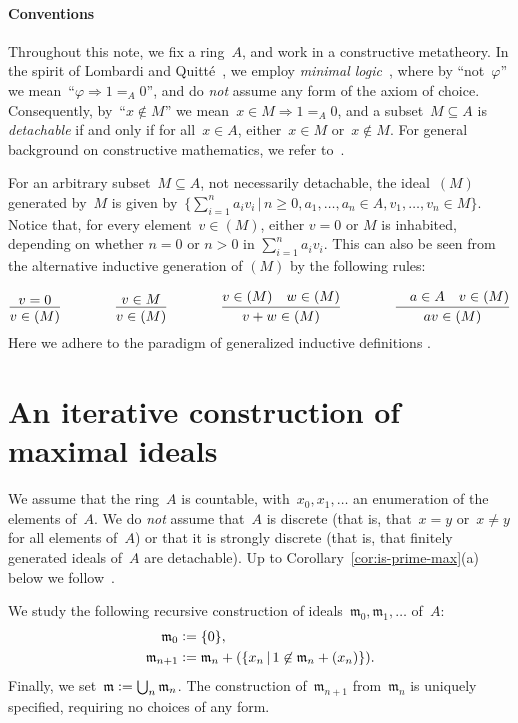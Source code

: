 \documentclass[com,11pt,crcready]{iosart2x}
\theoremstyle{definition}
\theoremstyle{plain}
\theoremstyle{remark}
\newcommand{\mmm}{\mathfrak{m}}
\newcommand{\defeq}{\vcentcolon=}
\renewcommand{\_}{\mathpunct{.}\,}
\begin{document}
\paragraph{Conventions} Throughout this note, we fix a ring~$A$, and work in a constructive metatheory.
In the spirit of Lombardi and Quitté~\cite{lombardi-quitte:constructive-algebra}, we employ \emph{minimal
logic}~\cite{johansson:minimal}, where by ``not~$\varphi$'' we mean~``$\varphi \Rightarrow 1 =_A 0$'', and do \emph{not} assume any form of the axiom of choice. Consequently,
by~``$x \not\in M$'' we mean~$x \in M \Rightarrow 1 =_A 0$, and a subset~$M
\subseteq A$ is \emph{detachable} if and only if for all~$x \in A$, either~$x \in M$
or~$x \not\in M$. For general background on constructive mathematics, we refer
to~\cite{bauer:five-stages,bauer:int-mathematics,sep:constructive-mathematics}.

For an arbitrary subset~$M \subseteq A$, not necessarily
detachable, the ideal~$(M)$ generated by~$M$ is given by~$\bigl\{ \sum_{i=1}^n
a_i v_i \,\Big|\, n \geq 0, a_1,\ldots,a_n \in A, v_1,\ldots,v_n \in M \bigr\}$.
Notice that, for every element~$v \in (M)$, either $v = 0$ or $M$ is inhabited, depending on whether
$n=0$ or $n>0$ in $\sum_{i=1}^n a_i v_i$. This can also be seen from the alternative inductive
generation of $(M)$ by the following rules:\par
{\vspace*{-0.8em}\small\[
\infer{v \in (M)}{v=0}
\qquad\qquad
\infer{v \in (M)}{v \in M}
\qquad\qquad
\infer{v+w \in (M)}{v \in (M)\quad w \in (M)}
\qquad\qquad
\infer{av \in (M)}{\quad a\in A \quad v \in (M)}
\]}%
\noindent Here we adhere to the paradigm of generalized inductive definitions
\cite{aczel-rathjen:notes,aczel-rathjen:cstdraft,rathjen:genind}.


\section{An iterative construction of maximal ideals}
\label{sect:constr}

We assume that the ring~$A$ is countable, with~$x_0, x_1, \ldots$ an
enumeration of the elements of~$A$. We do \emph{not} assume that~$A$ is
discrete (that is, that~$x = y$ or~$x \neq y$ for all elements of~$A$) or that
it is strongly discrete (that is, that finitely generated
ideals of~$A$ are detachable). Up to Corollary~\ref{cor:is-prime-max}(a) below
we follow~\cite{berardi-valentini:krivine}.

We study the following recursive construction of ideals~$\mmm_0, \mmm_1,
\ldots$ of~$A$:
\begin{align*}
  \mmm_0 &\defeq \{0\}, \\
  \mmm_{n+1} &\defeq \mmm_n + (\{ x_n \,|\, 1 \not\in \mmm_n + (x_n) \}).
\end{align*}
Finally, we set~$\mmm \defeq \bigcup_n \mmm_n$. The construction
of~$\mmm_{n+1}$ from~$\mmm_n$ is uniquely specified, requiring no choices of
any form.
\end{document}
